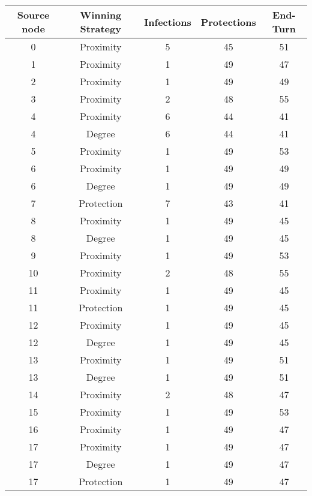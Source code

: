 \documentclass[results.tex]{subfiles}
\begin{document}
\begin{center}
  \begin{tabular}{| c || c | c | c | c |}
    \hline
    {\bfseries Source node} & {\bfseries Winning Strategy} & {\bfseries Infections} & {\bfseries Protections} & {\bfseries End-Turn} \\  %
    \hline\hline
    0 & Proximity & 5 & 45 & 51 \\ 
    \hline
    1 & Proximity & 1 & 49 & 47 \\ 
    \hline
    2 & Proximity & 1 & 49 & 49 \\ 
    \hline
    3 & Proximity & 2 & 48 & 55 \\ 
    \hline
    4 & Proximity & 6 & 44 & 41 \\ 
    \hline
    4 & Degree & 6 & 44 & 41 \\ 
    \hline
    5 & Proximity & 1 & 49 & 53 \\ 
    \hline
    6 & Proximity & 1 & 49 & 49 \\ 
    \hline
    6 & Degree & 1 & 49 & 49 \\ 
    \hline
    7 & Protection & 7 & 43 & 41 \\ 
    \hline
    8 & Proximity & 1 & 49 & 45 \\ 
    \hline
    8 & Degree & 1 & 49 & 45 \\ 
    \hline
    9 & Proximity & 1 & 49 & 53 \\ 
    \hline
    10 & Proximity & 2 & 48 & 55 \\ 
    \hline
    11 & Proximity & 1 & 49 & 45 \\ 
    \hline
    11 & Protection & 1 & 49 & 45 \\ 
    \hline
    12 & Proximity & 1 & 49 & 45 \\ 
    \hline
    12 & Degree & 1 & 49 & 45 \\ 
    \hline
    13 & Proximity & 1 & 49 & 51 \\ 
    \hline
    13 & Degree & 1 & 49 & 51 \\ 
    \hline
    14 & Proximity & 2 & 48 & 47 \\ 
    \hline
    15 & Proximity & 1 & 49 & 53 \\ 
    \hline
    16 & Proximity & 1 & 49 & 47 \\ 
    \hline
    17 & Proximity & 1 & 49 & 47 \\ 
    \hline
    17 & Degree & 1 & 49 & 47 \\ 
    \hline
    17 & Protection & 1 & 49 & 47 \\ 

\end{tabular}
\end{center}
\end{document}
